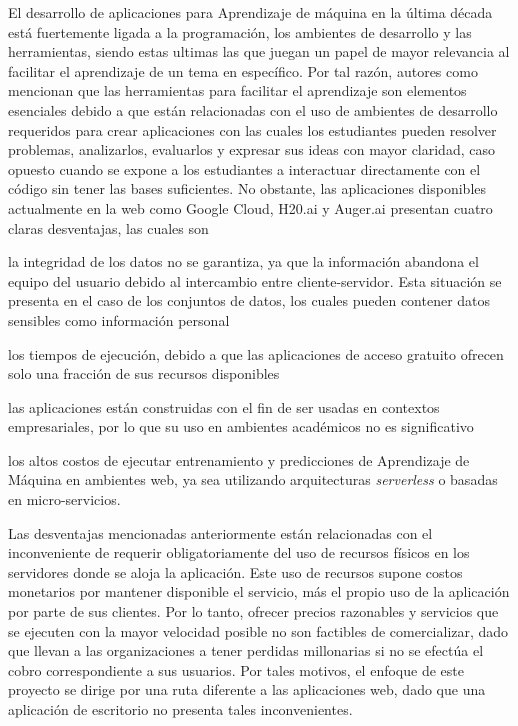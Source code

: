 El desarrollo de aplicaciones para Aprendizaje de máquina en la última década está fuertemente ligada a la programación, los ambientes de desarrollo y las herramientas, siendo estas ultimas las que juegan un papel de mayor relevancia al facilitar el aprendizaje de un tema en específico. Por tal razón, autores como \textcite{Francis1983, Salleh2013} mencionan que las herramientas para facilitar el aprendizaje son elementos esenciales debido a que están relacionadas con el uso de ambientes de desarrollo requeridos para crear aplicaciones con las cuales los estudiantes pueden resolver problemas, analizarlos, evaluarlos y expresar sus ideas con mayor claridad, caso opuesto cuando se expone a los estudiantes a interactuar directamente con el código sin tener las bases suficientes. No obstante, las aplicaciones disponibles actualmente en la web como Google Cloud, H20.ai y Auger.ai presentan cuatro claras desventajas, las cuales son 
\begin{seriate}
    \item la integridad de los datos no se garantiza, ya que la información abandona el equipo del usuario debido al intercambio entre cliente-servidor. Esta situación se presenta en el caso de los conjuntos de datos, los cuales pueden contener datos sensibles como información personal
    \item los tiempos de ejecución, debido a que las aplicaciones de acceso gratuito ofrecen solo una fracción de sus recursos disponibles
    \item las aplicaciones están construidas con el fin de ser usadas en contextos empresariales, por lo que su uso en ambientes académicos no es significativo
    \item los altos costos de ejecutar entrenamiento y predicciones de Aprendizaje de Máquina en ambientes web, ya sea utilizando arquitecturas \textit{serverless} o basadas en micro-servicios.
\end{seriate}

Las desventajas mencionadas anteriormente están relacionadas con el inconveniente de requerir obligatoriamente del uso de recursos físicos en los servidores donde se aloja la aplicación. Este uso de recursos supone costos monetarios por mantener disponible el servicio, más el propio uso de la aplicación por parte de sus clientes. Por lo tanto, ofrecer precios razonables y servicios que se ejecuten con la mayor velocidad posible no son factibles de comercializar, dado que llevan a las organizaciones a tener perdidas millonarias si no se efectúa el cobro correspondiente a sus usuarios. Por tales motivos, el enfoque de este proyecto se dirige por una ruta diferente a las aplicaciones web, dado que una aplicación de escritorio no presenta tales inconvenientes.




